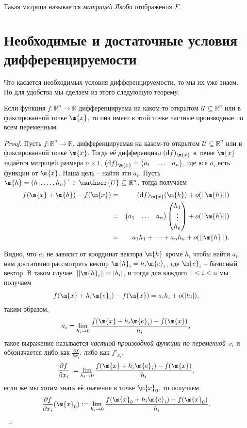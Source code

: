 Такая матрица называется \textit{матрицей Якоби} отображения $F.$



\section{Необходимые и достаточные условия дифференцируемости}

Что касается необходимых условия дифференцируемости, то мы их уже знаем. Но для удобства мы сделаем из этого следующую теорему:

\begin{theorem}
    Если функция $f:\mathbb{R}^n \to \mathbb{R}$ дифференцируема на каком-то открытом $\mathscr{U} \subseteq \mathbb{R}^n$ или в фиксированной точке $\m{x}$, то она имеет в этой точке частные производные по всем переменным.
\end{theorem}

\begin{proof}
   Пусть $f:\mathbb{R}^n \to \mathbb{R}$, дифференцируемая на каком-то открытом $\mathscr{U} \subseteq \mathbb{R}^n$ или в фиксированной точке $\m{x}$. Тогда её дифференциал $(\mathrm{d}f)_\m{x}$ в точке $\m{x}$ задаётся матрицей размера $n\times 1$, $(\mathrm{d}f)_\m{x} = \begin{pmatrix}
    a_1 & \ldots & a_n
\end{pmatrix}$, где все $a_i$ есть функции от $\m{x}$. Наша цель -- найти эти $a_i$. Пусть $\m{h} = (h_1, \ldots, h_n)^\top \in \mathscr{U} \subseteq \mathbb{R}^n$, тогда получаем
\begin{eqnarray*}
    f(\m{x} + \m{h}) - f(\m{x}) &=& (\mathrm{d}f)_\m{x}(\m{h}) + o(||\m{h}||) \\
    &=& \begin{pmatrix}
        a_1 & \ldots & a_n
    \end{pmatrix} \begin{pmatrix}
        h_1 \\ \vdots \\ h_n  \end{pmatrix} + o(||\m{h}||) \\
        &=& a_1h_1 + \cdots + a_nh_n + o(||\m{h}||).
\end{eqnarray*}

Видно, что $a_i$ не зависит от координат вектора $\m{h}$ кроме $h_i$ \ie чтобы найти $a_i$, нам достаточно рассмотреть вектор $\m{h}_i = h_i \m{e}_i$, где $\m{e}_i$ -- базисный вектор. В таком случае, $||\m{h}_i|| = |h_i|$, и тогда для каждого $1 \le i \le n$ мы получаем
\[
 f(\m{x} + h_i \m{e}_i) - f(\m{x}) = a_ih_i + o(|h_i|),
\]
таким образом, 
\[
 a_i = \lim_{h_i \to 0} \frac{f(\m{x} + h_i \m{e}_i) - f(\m{x})}{h_i},
\]
такое выражение называется \textit{частной производной функции по переменной $x_i$} и обозначается либо как $\frac{\partial f}{\partial x_i}$, либо как $f'_{x_i}$, \ie 
\[
 \frac{\partial f}{\partial x_i}: = \lim_{h_i \to 0} \frac{f(\m{x} + h_i \m{e}_i) - f(\m{x})}{h_i},
\]
если же мы хотим знать её значение в точке $\m{x}_0$, то получаем
\[
 \frac{\partial f}{\partial x_i}(\m{x}_0): = \lim_{h_i \to 0} \frac{f(\m{x}_0 + h_i \m{e}_i) - f(\m{x}_0)}{h_i}.
\]
\end{proof}


